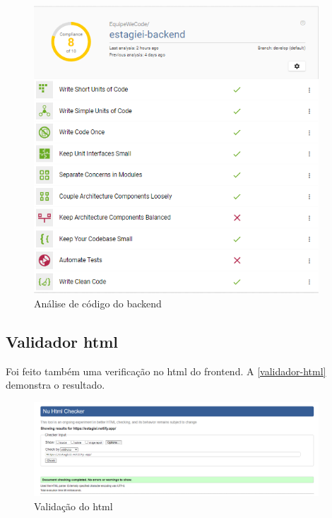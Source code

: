 \begin{figure}[H]
	\centering
	\caption{\label{better-code-back}Análise de código do \gls{backend}}
	\includegraphics[width=0.95\textwidth]{../imagens/web-tests/better-code-back.png}
\end{figure}

\subsection{Validador \ac{html}}
Foi feito também uma verificação no \ac{html} do \ac{frontend}. A \autoref{validador-html} demonstra o resultado.

\begin{figure}[H]
	\centering
	\caption{\label{validador-html}Validação do \ac{html}}
	\includegraphics[width=0.95\textwidth]{../imagens/web-tests/validador-html.png}
\end{figure}

